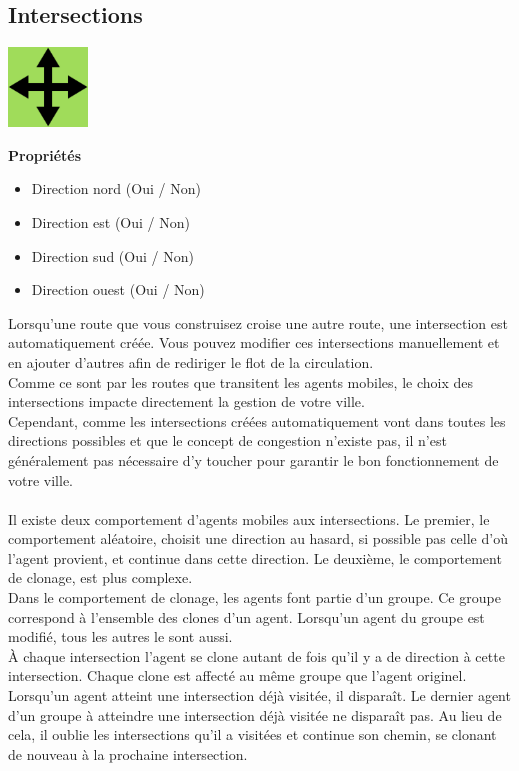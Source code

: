 \documentclass[11pt]{report}
\begin{document}
\subsection{Intersections}
\begin{center}
	\begin{minipage}{0.25\textwidth}
		\begin{flushright}
			\includegraphics[height=80px]{intersection4}
		\end{flushright}
	\end{minipage}
	\begin{minipage}{0.7\textwidth}
		\textbf{Propriétés}
		\begin{itemize}
			\item Direction nord (Oui / Non)
			\item Direction est (Oui / Non)
			\item Direction sud (Oui / Non)
			\item Direction ouest (Oui / Non)
		\end{itemize}
	\end{minipage}
\end{center}
Lorsqu'une route que vous construisez croise une autre route, une intersection est automatiquement créée. Vous pouvez modifier ces intersections manuellement et en ajouter d'autres afin de rediriger le flot de la circulation.\\
Comme ce sont par les routes que transitent les agents mobiles, le choix des intersections impacte directement la gestion de votre ville.\\
Cependant, comme les intersections créées automatiquement vont dans toutes les directions possibles et que le concept de congestion n'existe pas, il n'est généralement pas nécessaire d'y toucher pour garantir le bon fonctionnement de votre ville.\\
\\
Il existe deux comportement d'agents mobiles aux intersections.
Le premier, le comportement aléatoire, choisit une direction au hasard, si possible pas celle d'où l'agent provient, et continue dans cette direction.
Le deuxième, le comportement de clonage, est plus complexe.\\
Dans le comportement de clonage, les agents font partie d'un groupe. Ce groupe correspond à l'ensemble des clones d'un agent. Lorsqu'un agent du groupe est modifié, tous les autres le sont aussi.\\
À chaque intersection l'agent se clone autant de fois qu'il y a de direction à cette intersection. Chaque clone est affecté au même groupe que l'agent originel. Lorsqu'un agent atteint une intersection déjà visitée, il disparaît. Le dernier agent d'un groupe à atteindre une intersection déjà visitée ne disparaît pas. Au lieu de cela, il oublie les intersections qu'il a visitées et continue son chemin, se clonant de nouveau à la prochaine intersection.
\end{document}

